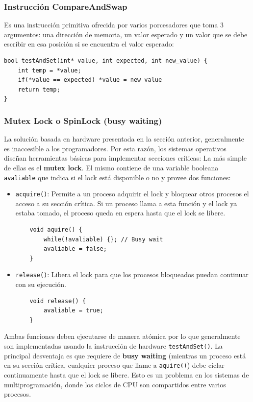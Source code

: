\subsubsection{Instrucción CompareAndSwap}\label{compareAndSwap}
Es una instrucción primitiva ofrecida por varios porcesadores que toma 3 argumentos: una dirección de memoria, un valor esperado y un valor que se debe escribir en esa posición si se encuentra el valor esperado:

		\begin{verbatim}
bool testAndSet(int* value, int expected, int new_value) {
	int temp = *value;
	if(*value == expected) *value = new_value
	return temp;
}
		\end{verbatim}

\subsubsection{Mutex Lock o SpinLock (busy waiting)} 
La solución basada en hardware presentada en la sección anterior, generalmente es inaccesible a los programadores. Por esta razón, los sistemas operativos diseñan herramientas básicas para implementar secciones críticas: La más simple de ellas es el \textbf{mutex lock}. El mismo contiene de una variable booleana \texttt{avaliable} que indica si el lock está disponible o no y provee dos funciones: 

\begin{itemize}
\item \texttt{acquire()}: Permite a un proceso adquirir el lock y bloquear otros procesos el acceso a su sección crítica. Si un proceso llama a esta función y el lock ya estaba tomado, el proceso queda en espera hasta que el lock se libere.

\begin{verbatim}
	void aquire() {
		while(!avaliable) {}; // Busy wait
		avaliable = false;	
	}
\end{verbatim}
\item \texttt{release()}: Libera el lock para que los procesos bloqueados puedan continuar con su ejecución.
\begin{verbatim}
	void release() {
		avaliable = true;	
	}
\end{verbatim}
\end{itemize}

Ambas funciones deben ejecutarse de manera atómica por lo que generalmente son implementadas usando la instrucción de hardware \texttt{testAndSet()}. La principal desventaja es que requiere de \textbf{busy waiting} (mientras un proceso está en su sección crítica, cualquier proceso que llame a \texttt{aquire()}) debe ciclar continuamente hasta que el lock se libere. Esto es un problema en los sistemas de multiprogramación, donde los ciclos de CPU son compartidos entre varios procesos.

